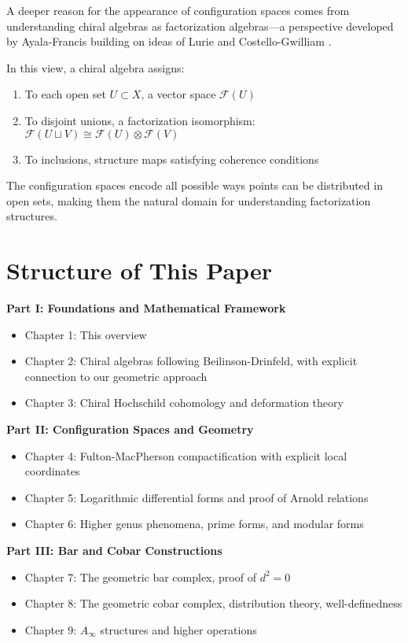 A deeper reason for the appearance of configuration spaces comes from understanding chiral algebras as factorization algebras—a perspective developed by Ayala-Francis \cite{AF15} building on ideas of Lurie \cite{HA} and Costello-Gwilliam \cite{CG17}. 

In this view, a chiral algebra assigns:
\begin{enumerate}
\item To each open set $U \subset X$, a vector space $\mathcal{F}(U)$
\item To disjoint unions, a factorization isomorphism: $\mathcal{F}(U \sqcup V) \cong \mathcal{F}(U) \otimes \mathcal{F}(V)$
\item To inclusions, structure maps satisfying coherence conditions
\end{enumerate}

The configuration spaces encode all possible ways points can be distributed in open sets, making them the natural domain for understanding factorization structures.





\section{Structure of This Paper}

\textbf{Part I: Foundations and Mathematical Framework}
\begin{itemize}
\item Chapter 1: This overview
\item Chapter 2: Chiral algebras following Beilinson-Drinfeld, with explicit connection to our geometric approach
\item Chapter 3: Chiral Hochschild cohomology and deformation theory
\end{itemize}

\textbf{Part II: Configuration Spaces and Geometry}
\begin{itemize}
\item Chapter 4: Fulton-MacPherson compactification with explicit local coordinates
\item Chapter 5: Logarithmic differential forms and proof of Arnold relations
\item Chapter 6: Higher genus phenomena, prime forms, and modular forms
\end{itemize}

\textbf{Part III: Bar and Cobar Constructions}
\begin{itemize}
\item Chapter 7: The geometric bar complex, proof of $d^2 = 0$
\item Chapter 8: The geometric cobar complex, distribution theory, well-definedness
\item Chapter 9: $A_\infty$ structures and higher operations
\end{itemize}


